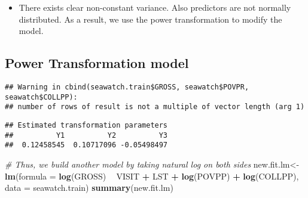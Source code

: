 \documentclass[]{article}
\newenvironment{Shaded}{\begin{snugshade}}{\end{snugshade}}
\newcommand{\KeywordTok}[1]{\textcolor[rgb]{0.13,0.29,0.53}{\textbf{#1}}}
\newcommand{\DataTypeTok}[1]{\textcolor[rgb]{0.13,0.29,0.53}{#1}}
\newcommand{\DecValTok}[1]{\textcolor[rgb]{0.00,0.00,0.81}{#1}}
\newcommand{\StringTok}[1]{\textcolor[rgb]{0.31,0.60,0.02}{#1}}
\newcommand{\CommentTok}[1]{\textcolor[rgb]{0.56,0.35,0.01}{\textit{#1}}}
\newcommand{\OperatorTok}[1]{\textcolor[rgb]{0.81,0.36,0.00}{\textbf{#1}}}
\newcommand{\NormalTok}[1]{#1}
\providecommand{\tightlist}{%
  \setlength{\itemsep}{0pt}\setlength{\parskip}{0pt}}
\begin{document}
\begin{itemize}
\tightlist
\item
  There exists clear non-constant variance. Also predictors are not
  normally distributed. As a result, we use the power transformation to
  modify the model.
\end{itemize}

\subsection{Power Transformation
model}\label{power-transformation-model}

\begin{Shaded}
\end{Shaded}

\begin{verbatim}
## Warning in cbind(seawatch.train$GROSS, seawatch$POVPR, seawatch$COLLPP):
## number of rows of result is not a multiple of vector length (arg 1)
\end{verbatim}

\begin{verbatim}
## Estimated transformation parameters 
##          Y1          Y2          Y3 
##  0.12458545  0.10717096 -0.05498497
\end{verbatim}

\begin{Shaded}
\begin{Highlighting}[]
\CommentTok{# Thus, we build another model by taking natural log on both sides}
\NormalTok{new.fit.lm<-}\KeywordTok{lm}\NormalTok{(}\DataTypeTok{formula =} \KeywordTok{log}\NormalTok{(GROSS) }\OperatorTok{~}\StringTok{ }\NormalTok{VISIT }\OperatorTok{+}\StringTok{ }\NormalTok{LST }\OperatorTok{+}\StringTok{ }\KeywordTok{log}\NormalTok{(POVPP) }\OperatorTok{+}\StringTok{ }\KeywordTok{log}\NormalTok{(COLLPP), }\DataTypeTok{data =}\NormalTok{ seawatch.train)}
\KeywordTok{summary}\NormalTok{(new.fit.lm)}
\end{Highlighting}
\end{Shaded}
\end{document}
